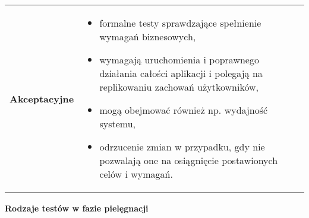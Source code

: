 \documentclass[../main.tex]{subfiles}
\begin{document}
\begin{table}[H]
\begin{center}
\begin{tabular}{ p{5cm} p{11cm} }
                \toprule

                \textbf{Akceptacyjne}
                &
                \begin{itemize}
                    \item formalne testy sprawdzające spełnienie wymagań biznesowych,
                    \item wymagają uruchomienia i
                    poprawnego działania całości aplikacji i polegają na replikowaniu zachowań użytkowników,
                    \item mogą obejmować również np. wydajność systemu,
                    \item odrzucenie zmian w przypadku, gdy nie pozwalają one na
                    osiągnięcie postawionych celów i wymagań.
                \end{itemize}
                \\
            \end{tabular}
        \end{center}
    \end{table}

    \pagebreak
    \textbf{Rodzaje testów w fazie pielęgnacji}
\end{document}
